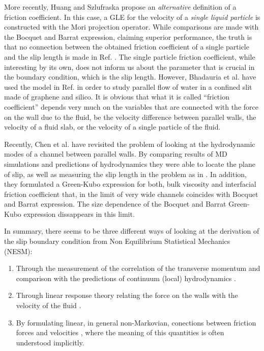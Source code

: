 \documentclass[b5paper,openright,10pt]{book}
\begin{document}
More recently,  Huang and  Szlufraska propose  an \textit{alternative}
definition of a friction  coefficient\cite{Huang2014}. In this case, a
GLE  for   the  velocity  of  a  \textit{single liquid  particle}  is
constructed with the Mori  projection operator.  While comparisons are
made with the Bocquet and Barrat expression,  claiming superior performance, the truth
is that no  connection between the obtained friction  coefficient of a
single particle and the slip length is made in Ref.  \cite{Huang2014}.
The  single particle  friction coefficient,  while interesting  by its
own, does  not inform us  about the parameter  that is crucial  in the
boundary condition, which  is the slip length.   However, Bhadauria et
al. \cite{Bhadauria2015} have used  the model in Ref. \cite{Huang2014}
in order to  study parallel flow of  water in a confined  slit made of
graphene and silico.  It is obvious  that what it is called ``friction
coefficient'' depends  very much on  the variables that  are connected
with  the  force  on the  wall  due  to  the  fluid, be  the  velocity
difference between  parallel walls\cite{Bocquet1994,Petravic2007}, the
velocity of a fluid slab\cite{Hansen2011}, or the velocity of a single
particle of the fluid\cite{Huang2014}.


Recently, Chen  et al. have  revisited the  problem of looking  at the
hydrodynamic modes of a channel between parallel walls\cite{Chen2015}.
By   comparing  results   of   MD  simulations   and  predictions   of
hydrodynamics they were  able to locate the plane of  slip, as well as
measuring the slip length in the problem as in \cite{Bocquet1994}.  In
addition,  they  formulated a  Green-Kubo  expression  for both,  bulk
viscosity and interfacial  friction coefficient that, in  the limit of
very wide channels coincides with  Bocquet and Barrat expression.  The size dependence
of the Bocquet and Barrat Green-Kubo expression dissappears in this limit.

In summary, there  seems to be three different ways  of looking at the
derivation  of  the  slip   boundary  condition  from  Non Equilibrium
Statistical Mechanics (NESM): 
\begin{enumerate}
  \item Through the  measurement of the correlation of
the  transverse  momentum  and  comparison  with  the  predictions  of
continuum  (local) hydrodynamics  \cite{Bocquet1993,Chen2015}.
\item Through
linear  response theory  relating  the  force on  the  walls with  the
velocity   of  the   fluid   \cite{Bocquet1993,Petravic2007}.
\item By
formulating  linear,  in  general  non-Markovian,  conections  between
friction forces and velocities \cite{Hansen2011}, where the meaning of
this quantities is often understood implicitly.
\end{enumerate}
\end{document}
